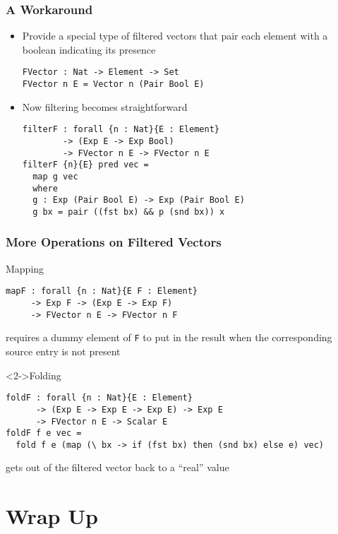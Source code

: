 \documentclass{beamer}
\begin{document}
\begin{frame}[fragile]
  \frametitle{A Workaround}
  \begin{itemize}
  \item Provide a special type of filtered vectors that pair each
    element with a boolean indicating its presence
\begin{verbatim}
FVector : Nat -> Element -> Set
FVector n E = Vector n (Pair Bool E)
\end{verbatim}
  \item<2-> Now filtering becomes straightforward 
\begin{verbatim}
filterF : forall {n : Nat}{E : Element}
        -> (Exp E -> Exp Bool)
        -> FVector n E -> FVector n E
filterF {n}{E} pred vec =
  map g vec
  where
  g : Exp (Pair Bool E) -> Exp (Pair Bool E)
  g bx = pair ((fst bx) && p (snd bx)) x
\end{verbatim}
  \end{itemize}
\end{frame}
\begin{frame}[fragile]
  \frametitle{More Operations on Filtered Vectors}
  \vspace{-\baselineskip}
  \begin{block}{Mapping}
  \vspace{-\baselineskip}\small
\begin{verbatim}
mapF : forall {n : Nat}{E F : Element}
     -> Exp F -> (Exp E -> Exp F) 
     -> FVector n E -> FVector n F
\end{verbatim}
    requires a dummy element of \texttt{F} to put in the result when
    the corresponding source entry is not present
  \end{block}
  \begin{block}<2->{Folding}
  \vspace{-\baselineskip}\small
\begin{verbatim}
foldF : forall {n : Nat}{E : Element}
      -> (Exp E -> Exp E -> Exp E) -> Exp E
      -> FVector n E -> Scalar E
foldF f e vec =
  fold f e (map (\ bx -> if (fst bx) then (snd bx) else e) vec)
\end{verbatim}
    gets out of the filtered vector back to a ``real'' value
  \end{block}
\end{frame}

\section{Wrap Up}
\end{document}
